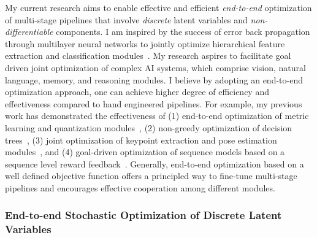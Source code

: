 \documentclass[a4paper, 10pt]{article}
\def\eg{{\em e.g.,}}
\newcommand{\figref}[1]{Figure~\ref{#1}}
\begin{document}

My current research aims to enable effective and efficient {\em
  end-to-end} optimization of multi-stage pipelines that involve {\em
  discrete} latent variables and {\em non-differentiable} components.
I am inspired by the success of error back propagation through
multilayer neural networks to jointly optimize hierarchical feature
extraction and classification modules~\cite{backprop,lecun98}.  My
research aspires to facilitate goal driven joint optimization of
complex AI systems, which comprise vision, natural language, memory,
and reasoning modules. I believe by adopting an end-to-end
optimization approach, one can achieve higher degree of efficiency and
effectiveness compared to hand engineered pipelines.  For example, my
previous work has demonstrated the effectiveness of (1) end-to-end
optimization of metric learning and quantization
modules~\cite{mlh,hdml}, (2) non-greedy optimization of decision
trees~\cite{engodt}, (3) joint optimization of keypoint extraction and
pose estimation modules~\cite{keypointnet}, and (4) goal-driven
optimization of sequence models based on a sequence level reward
feedback~\cite{mapo,ocd}. Generally, end-to-end optimization based on
a well defined objective function offers a principled way to fine-tune
multi-stage pipelines and encourages effective cooperation among
different modules.

\vspace*{-.2cm}
\subsubsection*{End-to-end Stochastic Optimization of Discrete Latent Variables}
\vspace*{-.1cm}
\end{document}
